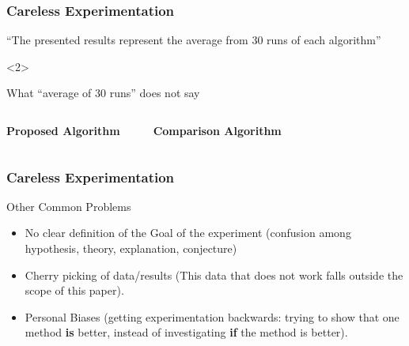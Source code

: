 \documentclass{beamer}
\begin{document}
\begin{frame}
  \frametitle{Careless Experimentation}
  
  \begin{block}{}
    ``The presented results represent the average from 30 runs of each
    algorithm''
  \end{block}

  \begin{onlyenv}<2>
  \begin{block}{What ``average of 30 runs'' does not say}
    \begin{columns}[c]
      {\bf Proposed Algorithm}
      \medskip

      \begin{itemize}
      \end{itemize}
      {\bf Comparison Algorithm}
      \medskip

      \begin{itemize}
      \end{itemize}
    \end{columns}
  \end{block}    
  \end{onlyenv}
\end{frame}

\begin{frame}
  \frametitle{Careless Experimentation}
  \begin{block}{Other Common Problems}
    \begin{itemize}
    \item No clear definition of the Goal of the experiment (confusion
      among hypothesis, theory, explanation, conjecture)
      \smallskip

    \item Cherry picking of data/results (This data that does not work
      falls outside the scope of this paper).
      \smallskip

    \item Personal Biases (getting experimentation backwards: trying
      to show that one method {\bf is} better, instead of
      investigating {\bf if} the method is better).
    \end{itemize}
  \end{block}
\end{frame}
\end{document}
